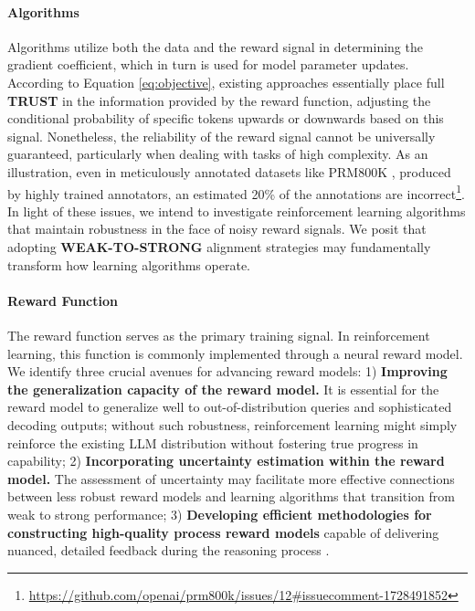 \begin{itemize}[topsep=0pt]
\begin{itemize}[topsep=0pt]
\paragraph{Algorithms} Algorithms utilize both the data and the reward signal in determining the gradient coefficient, which in turn is used for model parameter updates. According to Equation \ref{eq:objective}, existing approaches essentially place full \textbf{TRUST} in the information provided by the reward function, adjusting the conditional probability of specific tokens upwards or downwards based on this signal. Nonetheless, the reliability of the reward signal cannot be universally guaranteed, particularly when dealing with tasks of high complexity. As an illustration, even in meticulously annotated datasets like PRM800K \citep{lightman2023let}, produced by highly trained annotators, an estimated 20\% of the annotations are incorrect\footnote{\url{https://github.com/openai/prm800k/issues/12\#issuecomment-1728491852}}. In light of these issues, we intend to investigate reinforcement learning algorithms that maintain robustness in the face of noisy reward signals. We posit that adopting \textbf{WEAK-TO-STRONG} \citep{burns2023weak} alignment strategies may fundamentally transform how learning algorithms operate.

\paragraph{Reward Function} The reward function serves as the primary training signal. In reinforcement learning, this function is commonly implemented through a neural reward model. We identify three crucial avenues for advancing reward models: 1) \textbf{Improving the generalization capacity of the reward model.} It is essential for the reward model to generalize well to out-of-distribution queries and sophisticated decoding outputs; without such robustness, reinforcement learning might simply reinforce the existing LLM distribution without fostering true progress in capability; 2) \textbf{Incorporating uncertainty estimation within the reward model.} The assessment of uncertainty may facilitate more effective connections between less robust reward models and learning algorithms that transition from weak to strong performance; 3) \textbf{Developing efficient methodologies for constructing high-quality process reward models} capable of delivering nuanced, detailed feedback during the reasoning process \citep{lightman2023let,wang2023math}.


\end{itemize}
\end{itemize}
